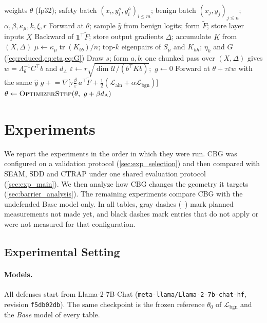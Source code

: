 \documentclass[11pt]{article}
\newcommand{\U}{\mathcal{U}}
\newcommand{\Laln}{\mathcal{L}_{\mathrm{aln}}}
\newcommand{\Lbgn}{\mathcal{L}_{\mathrm{bgn}}}
\newcommand{\Lam}{\Lambda_{\theta}}
\newcommand{\Ft}{\widetilde{F}}
\newcommand{\etak}{\eta_{k}}
\newcommand{\tr}{\operatorname{tr}}
\newcommand{\Smu}{S_{\mu}}
\newcommand{\tbd}{\textcolor{gray}{--}}
\begin{document}
\begin{algorithm}[t]
\caption{One CBG training step}
\label{alg:cbg}
\small
\begin{algorithmic}[1]
\Require weights $\theta$ (fp32); safety batch $(x_i,y_i^s,y_i^h)_{i\le m}$; benign batch $(x_j,y_j)_{j\le n}$; $\alpha,\beta,\kappa_\mu,k,\xi,r$
\State Forward at $\theta$; sample $\hat y$ from benign logits; form $\Ft$; store layer inputs $X$
\State Backward of $\mathbf 1^\top\Ft$; store output gradients $\Delta$; accumulate $K$ from $(X,\Delta)$
\State $\mu\gets\kappa_\mu\tr(K_{bb})/n$; top-$k$ eigenpairs of $\Smu$ and $K_{hh}$; $\etak$ and $G$ (\cref{eq:reduced,eq:eta,eq:G})
\State Draw $s$; form $a,b$; one chunked pass over $(X,\Delta)$ gives $w=\Lam^{-1}C^\top b$ and $d_\Lambda$
\State $\varepsilon\gets r\sqrt{\dim\U/(b^\top Kb)}$;\ $g\gets0$
  \State Forward at $\theta+\tau\varepsilon w$ with the same $\hat y$
  \State $g\mathrel{+}=\nabla\bigl[\tau\tfrac{\beta}{\varepsilon}\,a^\top\Ft+\tfrac12(\Laln+\alpha\Lbgn)\bigr]$
\EndFor
\State $\theta\gets\textsc{OptimizerStep}(\theta,\ g+\beta d_\Lambda)$
\end{algorithmic}
\end{algorithm}



\providecommand{\tbd}{--}

\section{Experiments}
\label{sec:experiments}

We report the experiments in the order in which they were run. CBG was configured on a validation protocol (\cref{sec:exp_selection}) and then compared with SEAM, SDD and CTRAP under one shared evaluation protocol (\cref{sec:exp_main}). We then analyze how CBG changes the geometry it targets (\cref{sec:barrier_analysis}). The remaining experiments compare CBG with the undefended Base model only. In all tables, gray dashes (\tbd) mark planned measurements not made yet, and black dashes mark entries that do not apply or were not measured for that configuration.



\subsection{Experimental Setting}
\label{sec:setting}

\paragraph{Models.}
All defenses start from Llama-2-7B-Chat (\texttt{meta-llama/Llama-2-7b-chat-hf}, revision \texttt{f5db02db}). The same checkpoint is the frozen reference $\theta_0$ of $\Lbgn$ and the \emph{Base} model of every table.
\end{document}

